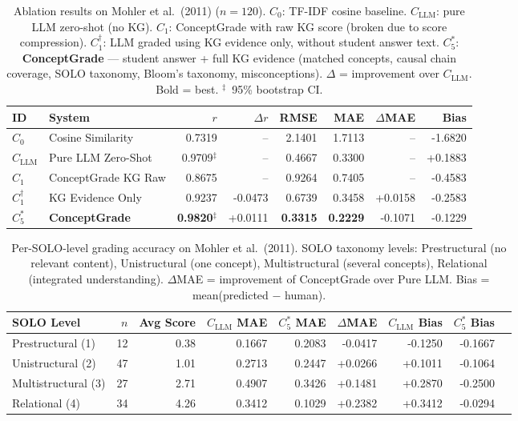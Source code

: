 \begin{table}[ht]\centering
\caption{Ablation results on Mohler et al.\ (2011) ($n=120$).
$C_0$: TF-IDF cosine baseline.
$C_{\text{LLM}}$: pure LLM zero-shot (no KG).
$C_1$: ConceptGrade with raw KG score (broken due to score compression).
$C_1^{\dagger}$: LLM graded using KG evidence only, without student answer text.
$C_5^{*}$: \textbf{ConceptGrade} --- student answer + full KG evidence
(matched concepts, causal chain coverage, SOLO taxonomy, Bloom's taxonomy, misconceptions).
$\Delta$ = improvement over $C_{\text{LLM}}$. Bold = best.
$^{\ddagger}$~95\% bootstrap CI.}
\label{tab:ablation_main}
\begin{tabular}{@{}llrrrrrr@{}}\toprule
\textbf{ID} & \textbf{System} & \textbf{$r$} & \textbf{$\Delta r$} &
\textbf{RMSE} & \textbf{MAE} & \textbf{$\Delta$MAE} & \textbf{Bias} \\\midrule
$C_0$ & Cosine Similarity & 0.7319 & -- & 2.1401 & 1.7113 & -- & -1.6820 \\
$C_{\text{LLM}}$ & Pure LLM Zero-Shot & 0.9709$^{\ddagger}$ & -- & 0.4667 & 0.3300 & -- & +0.1883 \\
\midrule
$C_1$ & ConceptGrade KG Raw & 0.8675 & -- & 0.9264 & 0.7405 & -- & -0.4583 \\
$C_1^{\dagger}$ & KG Evidence Only & 0.9237 & -0.0473 & 0.6739 & 0.3458 & +0.0158 & -0.2583 \\
$C_5^{*}$ & \textbf{ConceptGrade} & \textbf{0.9820}$^{\ddagger}$ & +0.0111 & \textbf{0.3315} & \textbf{0.2229} & -0.1071 & -0.1229 \\
\bottomrule
\end{tabular}\end{table}

\begin{table}[ht]\centering
\caption{Per-SOLO-level grading accuracy on Mohler et al.\ (2011).
SOLO taxonomy levels: Prestructural (no relevant content), Unistructural (one concept),
Multistructural (several concepts), Relational (integrated understanding).
$\Delta$MAE = improvement of ConceptGrade over Pure LLM. Bias = mean(predicted $-$ human).}
\label{tab:solo_breakdown}
\begin{tabular}{@{}lrrrrrrrr@{}}\toprule
\textbf{SOLO Level} & \textbf{$n$} & \textbf{Avg Score} &
\textbf{$C_{\text{LLM}}$ MAE} & \textbf{$C_5^{*}$ MAE} & \textbf{$\Delta$MAE} &
\textbf{$C_{\text{LLM}}$ Bias} & \textbf{$C_5^{*}$ Bias} \\\midrule
  Prestructural (1) & 12 & 0.38 & 0.1667 & 0.2083 & -0.0417 & -0.1250 & -0.1667 \\
  Unistructural (2) & 47 & 1.01 & 0.2713 & 0.2447 & +0.0266 & +0.1011 & -0.1064 \\
  Multistructural (3) & 27 & 2.71 & 0.4907 & 0.3426 & +0.1481 & +0.2870 & -0.2500 \\
  Relational (4) & 34 & 4.26 & 0.3412 & 0.1029 & +0.2382 & +0.3412 & -0.0294 \\
\bottomrule
\end{tabular}\end{table}

